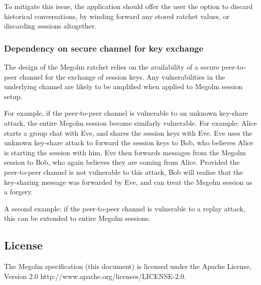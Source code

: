 \documentclass[10pt]{article}
\begin{document}
To mitigate this issue, the application should offer the user the option
to discard historical conversations, by winding forward any stored
ratchet values, or discarding sessions altogether.

\subsubsection{Dependency on secure channel for key
exchange}\label{dependency-on-secure-channel-for-key-exchange}

The design of the Megolm ratchet relies on the availability of a secure
peer-to-peer channel for the exchange of session keys. Any
vulnerabilities in the underlying channel are likely to be amplified
when applied to Megolm session setup.

For example, if the peer-to-peer channel is vulnerable to an unknown
key-share attack, the entire Megolm session become similarly vulnerable.
For example: Alice starts a group chat with Eve, and shares the session
keys with Eve. Eve uses the unknown key-share attack to forward the
session keys to Bob, who believes Alice is starting the session with
him. Eve then forwards messages from the Megolm session to Bob, who
again believes they are coming from Alice. Provided the peer-to-peer
channel is not vulnerable to this attack, Bob will realise that the
key-sharing message was forwarded by Eve, and can treat the Megolm
session as a forgery.

A second example: if the peer-to-peer channel is vulnerable to a replay
attack, this can be extended to entire Megolm sessions.

\subsection{License}\label{license}

The Megolm specification (this document) is licensed under the Apache
License, Version 2.0 http://www.apache.org/licenses/LICENSE-2.0.
\end{document}
